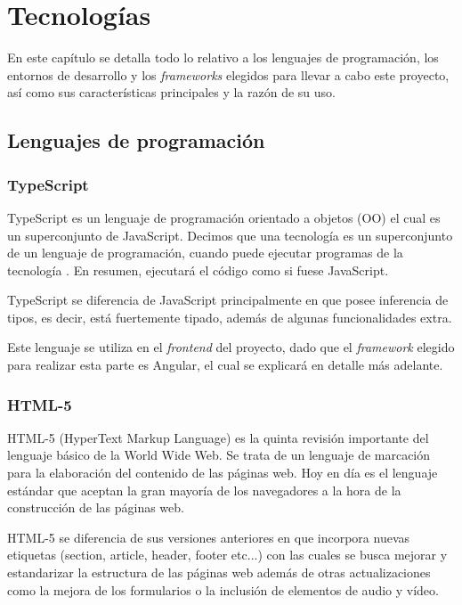 \chapter{Tecnologías}
 En este capítulo se detalla todo lo relativo a los lenguajes de programación, los entornos de desarrollo y los \textit{frameworks} elegidos para llevar a cabo este proyecto, así como sus características principales y la razón de su uso.
    
    \section{Lenguajes de programación}
    
    \subsection{TypeScript}
    TypeScript\cite{typescript} es un lenguaje de programación orientado a objetos (OO) el cual es un superconjunto de JavaScript. Decimos que una tecnología es un superconjunto de un lenguaje de programación, cuando puede ejecutar programas de la tecnología . En resumen, ejecutará el código como si fuese JavaScript. \newline
        
    TypeScript se diferencia de JavaScript principalmente en que posee inferencia de tipos, es decir, está fuertemente tipado, además de algunas funcionalidades extra.
    \newline
        
    Este lenguaje se utiliza en el \textit{frontend} del proyecto, dado que el \textit{framework} elegido para realizar esta parte es Angular, el cual se explicará en detalle más adelante.
        
    \subsection{HTML-5}
    HTML-5\cite{html} (HyperText Markup Language) es la quinta revisión importante del lenguaje básico de la World Wide Web. Se trata de un lenguaje de marcación para la elaboración del contenido de las páginas web.
    Hoy en día es el lenguaje estándar que aceptan la gran mayoría de los navegadores a la hora de la construcción de las páginas web.
    \newline
     
    HTML-5 se diferencia de sus versiones anteriores en que incorpora nuevas etiquetas (section, article, header, footer etc...) con las cuales se busca mejorar y estandarizar la estructura de las páginas web además de otras actualizaciones como la mejora de los formularios o la inclusión de elementos de audio y vídeo.
    \newline
    
